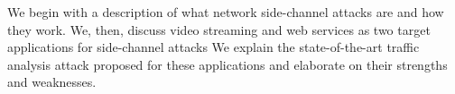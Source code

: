 We begin with a description of what network side-channel attacks are and how they work. 
We, then, discuss video streaming and web services as two target applications for side-channel attacks 
We explain the state-of-the-art traffic analysis attack proposed for these applications and elaborate on their strengths and weaknesses. 



